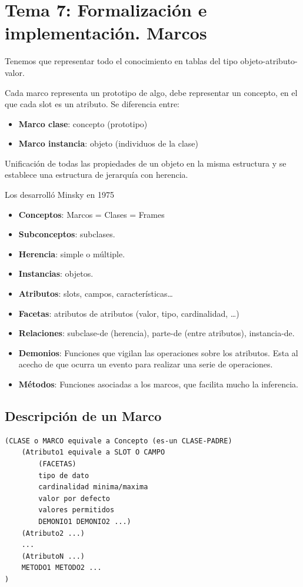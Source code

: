 \documentclass[12pt, twoside, openright]{report} %
\begin{document}
\chapter{Tema 7: Formalización e implementación. Marcos}
Tenemos que representar todo el conocimiento en tablas del tipo objeto-atributo-valor.

Cada marco representa un prototipo de algo, debe representar un concepto, en el que cada slot es un atributo. Se diferencia entre:
\begin{itemize}
	\item \textbf{Marco clase}: concepto (prototipo)
	\item \textbf{Marco instancia}: objeto (individuos de la clase)
\end{itemize}

Unificación de todas las propiedades de un objeto en la misma estructura y se establece una estructura de jerarquía con herencia.

Los desarrolló Minsky en 1975
\begin{itemize}
	\item \textbf{Conceptos}: Marcos = Clases = Frames
	\item \textbf{Subconceptos}: subclases.
	\item \textbf{Herencia}: simple o múltiple.
	\item \textbf{Instancias}: objetos.
	\item \textbf{Atributos}: slots, campos, características\dots
	\item \textbf{Facetas}: atributos de atributos (valor, tipo, cardinalidad, …)
	\item \textbf{Relaciones}: subclase-de (herencia), parte-de (entre atributos), instancia-de.
	\item \textbf{Demonios}: Funciones que vigilan las operaciones sobre los atributos. Esta al acecho de que ocurra un evento para realizar una serie de operaciones.
	\item \textbf{Métodos}: Funciones asociadas a los marcos, que facilita mucho la inferencia.
\end{itemize}
\pagebreak

\section{Descripción de un Marco}
\begin{lstlisting}
(CLASE o MARCO equivale a Concepto (es-un CLASE-PADRE)
	(Atributo1 equivale a SLOT O CAMPO
		(FACETAS) 
		tipo de dato
		cardinalidad minima/maxima
		valor por defecto
		valores permitidos
		DEMONIO1 DEMONIO2 ...)
	(Atributo2 ...)
	...
	(AtributoN ...)
	METODO1 METODO2 ...
)	
\end{lstlisting}
\end{document}
